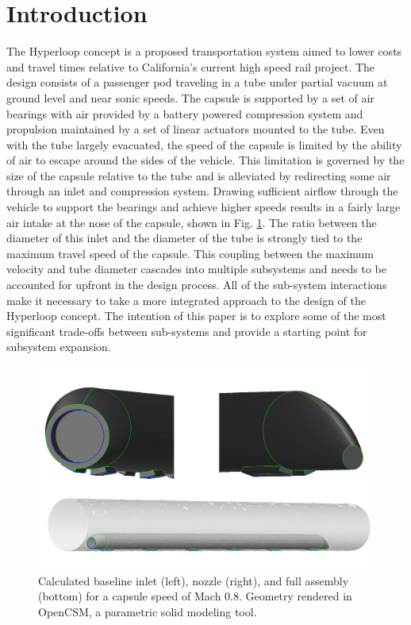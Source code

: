 \documentclass[heading.tex]{subfiles}
\begin{document}
\section{Introduction}


The Hyperloop concept is a proposed transportation system aimed to lower costs and travel times relative to California's current high speed
 rail project. \cite{Musk} The design consists of a passenger pod traveling in a tube under partial vacuum at ground level and near sonic
speeds. The capsule is supported by a set of air bearings with air provided by a battery powered compression system and propulsion maintained
by a set of linear actuators mounted to the tube. Even with the tube largely evacuated, the speed of the capsule is limited by the ability of air to
escape around the sides of the vehicle. This limitation is governed by the size of the capsule relative to the tube and is alleviated by redirecting some air
through an inlet and compression system. Drawing sufficient airflow through the vehicle to support the bearings and achieve higher speeds results
in a fairly large air intake at the nose of the capsule, shown in Fig. \ref{f:hyperloopCAD}. The ratio between the diameter of this inlet and the diameter of the
tube is strongly tied to the maximum travel speed of the capsule. This coupling between the maximum velocity and
tube diameter cascades into multiple subsystems and needs to be accounted for upfront in the design process. 
All of the sub-system interactions make it necessary to take a more integrated approach to the design of the Hyperloop concept. The intention of
this paper is to explore some of the most significant trade-offs between sub-systems and provide a starting point for subsystem expansion.

\begin{figure}[hbtp]
\centering
\includegraphics[width=\textwidth]{images/hyperloop_cad.png}
\caption{Calculated baseline inlet (left), nozzle (right), and full assembly (bottom) for a capsule speed of Mach 0.8. Geometry rendered in OpenCSM, a parametric solid modeling tool.}
\label{f:hyperloopCAD}
\end{figure}
\end{document}

